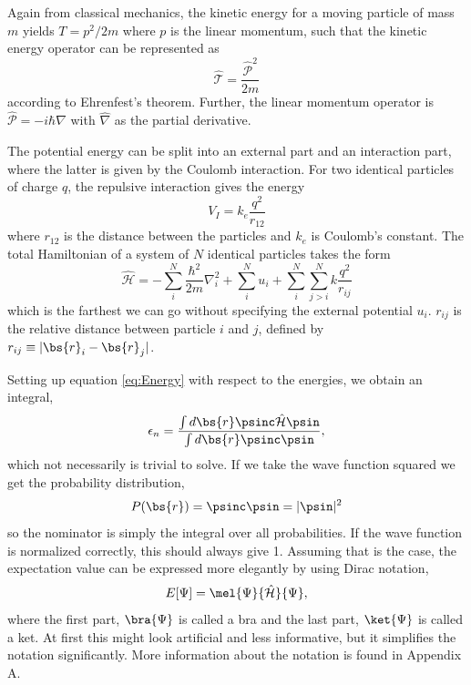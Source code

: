 Again from classical mechanics, the kinetic energy for a moving particle of mass $m$ yields $T=p^2/2m$ where $p$ is the linear momentum, such that the kinetic energy operator can be represented as 
\begin{equation}
\hat{\mathcal{T}}=\frac{\hat{\mathcal{P}}^2}{2m}
\end{equation}
according to Ehrenfest's theorem. Further, the linear momentum operator is $\hat{\mathcal{P}}=-i\hbar\hat{\nabla}$ with $\hat{\nabla}$ as the partial derivative. 

The potential energy can be split into an external part and an interaction part, where the latter is given by the Coulomb interaction. For two identical particles of charge $q$, the repulsive interaction gives the energy
\begin{equation}
V_I=k_e\frac{q^2}{r_{12}}
\end{equation}
where $r_{12}$ is the distance between the particles and $k_e$ is Coulomb's constant. The total Hamiltonian of a system of $N$ identical particles takes the form
\begin{equation}
\hat{\mathcal{H}}=-\sum_i^N\frac{\hbar^2}{2m}\nabla_i^2+\sum_i^{N}u_i + \sum_i^N\sum_{j>i}^Nk\frac{q^2}{r_{ij}}
\label{eq:ElectronicHamiltonian}
\end{equation}
which is the farthest we can go without specifying the external potential $u_i$. $r_{ij}$ is the relative distance between particle $i$ and $j$, defined by $r_{ij}\equiv|\bs{r}_i-\bs{r}_j|$.

Setting up equation \eqref{eq:Energy} with respect to the energies, we obtain an integral,
\begin{equation}
\epsilon_n=\frac{\int d\bs{r}\psinc\hat{\mathcal{H}}\psin}{\int d\bs{r}\psinc\psin},
\label{eq:energyintegral}
\end{equation}
which not necessarily is trivial to solve. If we take the wave function squared we get the probability distribution,
\begin{equation}
P(\bs{r})=\psinc\psin=|\psin|^2
\end{equation}
so the nominator is simply the integral over all probabilities. If the wave function is normalized correctly, this should always give 1. Assuming that is the case, the expectation value can be expressed more elegantly by using Dirac notation,
\begin{equation}
E[\Psi]=\mel{\Psi}{\hat{\mathcal{H}}}{\Psi},
\end{equation}
where the first part, $\bra{\Psi}$ is called a bra and the last part, $\ket{\Psi}$ is called a ket. At first this might look artificial and less informative, but it simplifies the notation significantly. More information about the notation is found in Appendix A. 

